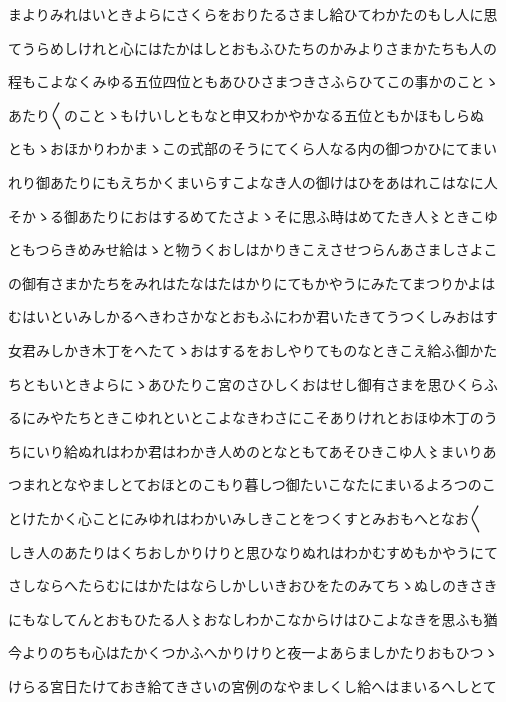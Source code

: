 \documentclass[a4paper,11pt,landscape]{ltjtarticle}
\begin{document}
まよりみれはいときよらにさくらをおりたるさまし給ひてわかたのもし人に思
\par\medskip
てうらめしけれと心にはたかはしとおもふひたちのかみよりさまかたちも人の
\par\medskip
程もこよなくみゆる五位四位ともあひひさまつきさふらひてこの事かのことゝ
\par\medskip
あたり〱のことゝもけいしともなと申又わかやかなる五位ともかほもしらぬ
\par\medskip
ともゝおほかりわかまゝこの式部のそうにてくら人なる内の御つかひにてまい
\par\medskip
れり御あたりにもえちかくまいらすこよなき人の御けはひをあはれこはなに人
\par\medskip
そかゝる御あたりにおはするめてたさよゝそに思ふ時はめてたき人〻ときこゆ
\par\medskip
ともつらきめみせ給はゝと物うくおしはかりきこえさせつらんあさましさよこ
\par\medskip
の御有さまかたちをみれはたなはたはかりにてもかやうにみたてまつりかよは
\par\medskip
むはいといみしかるへきわさかなとおもふにわか君いたきてうつくしみおはす
\par\medskip
女君みしかき木丁をへたてゝおはするをおしやりてものなときこえ給ふ御かた
\par\medskip
ちともいときよらにゝあひたりこ宮のさひしくおはせし御有さまを思ひくらふ
\par\medskip
るにみやたちときこゆれといとこよなきわさにこそありけれとおほゆ木丁のう
\par\medskip
ちにいり給ぬれはわか君はわかき人めのとなともてあそひきこゆ人〻まいりあ
\par\medskip
つまれとなやましとておほとのこもり暮しつ御たいこなたにまいるよろつのこ
\par\medskip
とけたかく心ことにみゆれはわかいみしきことをつくすとみおもへとなお〱
\par\medskip
しき人のあたりはくちおしかりけりと思ひなりぬれはわかむすめもかやうにて
\par\medskip
さしならへたらむにはかたはならしかしいきおひをたのみてちゝぬしのきさき
\par\medskip
にもなしてんとおもひたる人〻おなしわかこなからけはひこよなきを思ふも猶
\par\medskip
今よりのちも心はたかくつかふへかりけりと夜一よあらましかたりおもひつゝ
\par\medskip
けらる宮日たけておき給てきさいの宮例のなやましくし給へはまいるへしとて
\par\medskip
\end{document}
